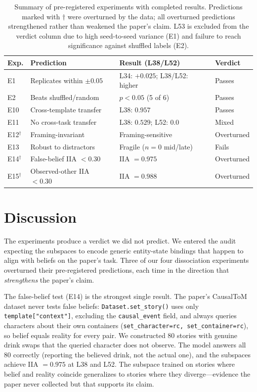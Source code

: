 \documentclass[11pt]{article}
\begin{document}
\begin{table}[t]
\centering
\caption{Summary of pre-registered experiments with completed results. Predictions marked with $\dagger$ were overturned by the data; all overturned predictions strengthened rather than weakened the paper's claim. L53 is excluded from the verdict column due to high seed-to-seed variance (E1) and failure to reach significance against shuffled labels (E2).}
\label{tab:summary}
\begin{tabular}{lp{3.2cm}p{3.2cm}l}
\toprule
\textbf{Exp.} & \textbf{Prediction} & \textbf{Result (L38/L52)} & \textbf{Verdict} \\
\midrule
E1 & Replicates within $\pm 0.05$ & L34: $+0.025$; L38/L52: higher & Passes \\
E2 & Beats shuffled/random & $p < 0.05$ (5 of 6) & Passes \\
E10 & Cross-template transfer & L38: $0.957$ & Passes \\
E11 & No cross-task transfer & L38: $0.529$; L52: $0.0$ & Mixed \\
E12$^\dagger$ & Framing-invariant & Framing-sensitive & Overturned \\
E13 & Robust to distractors & Fragile ($n=0$ mid/late) & Fails \\
E14$^\dagger$ & False-belief IIA $< 0.30$ & IIA $= 0.975$ & Overturned \\
E15$^\dagger$ & Observed-other IIA $< 0.30$ & IIA $= 0.988$ & Overturned \\
\bottomrule
\end{tabular}
\end{table}


\section{Discussion}
\label{sec:discussion}

The experiments produce a verdict we did not predict. We entered the audit expecting the subspaces to encode generic entity-state bindings that happen to align with beliefs on the paper's task. Three of our four dissociation experiments overturned their pre-registered predictions, each time in the direction that \emph{strengthens} the paper's claim.

The false-belief test (E14) is the strongest single result. The paper's CausalToM dataset never tests false beliefs: \texttt{Dataset.set\_story()} uses only \texttt{template["context"]}, excluding the \texttt{causal\_event} field, and always queries characters about their own containers (\texttt{set\_character=rc, set\_container=rc}), so belief equals reality for every pair. We constructed 80 stories with genuine drink swaps that the queried character does not observe. The model answers all 80 correctly (reporting the believed drink, not the actual one), and the subspaces achieve IIA $= 0.975$ at L38 and L52. The subspace trained on stories where belief and reality coincide generalizes to stories where they diverge---evidence the paper never collected but that supports its claim.
\end{document}
